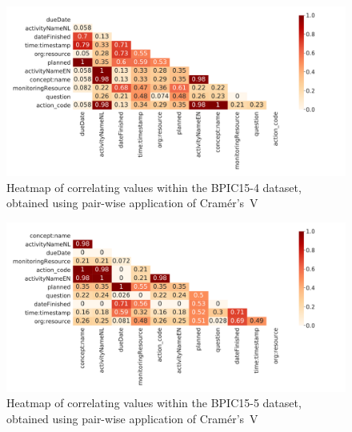 \begin{figure}[ht!]
\centering
\includegraphics[width=\textwidth]{gfx/bpic2015_4/correlation-heatmap.pdf}
\caption[Cramér's V heatmap of BPIC15-4]{Heatmap of correlating values within the BPIC15-4 dataset, obtained using pair-wise application of Cramér's~V}
\label{fig:BPIC15-4-correlation-heatmap}
\end{figure}

\begin{figure}[ht!]
\centering
\includegraphics[width=\textwidth]{gfx/bpic2015_5/correlation-heatmap.pdf}
\caption[Cramér's V heatmap of BPIC15-5]{Heatmap of correlating values within the BPIC15-5 dataset, obtained using pair-wise application of Cramér's~V}
\label{fig:BPIC15-5-correlation-heatmap}
\end{figure}
